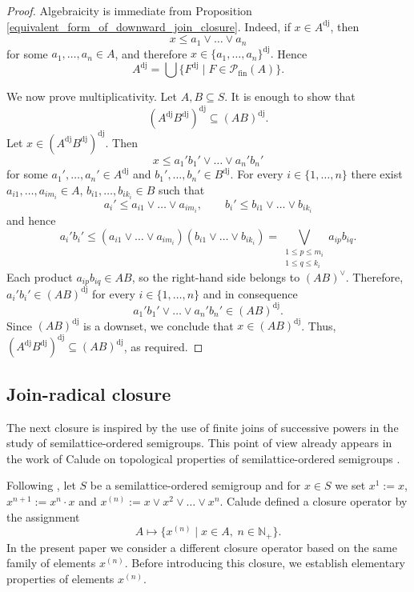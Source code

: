 \documentclass[10pt, reqno]{amsart}
\theoremstyle{plain}
\theoremstyle{definition}
\begin{document}
\begin{proof}
    Algebraicity is immediate from Proposition \ref{equivalent_form_of_downward_join_closure}. Indeed, if $x \in A^\mathrm{dj}$, then $$x \leqslant a_1 \lor \ldots \lor a_n$$ for some $a_1, \ldots, a_n \in A$, and therefore $x \in \{a_1, \ldots, a_n\}^\mathrm{dj}.$ Hence $$A^\mathrm{dj} = \bigcup\{F^\mathrm{dj} \mid F \in \mathcal{P}_\mathrm{fin}(A)\}.$$
    
    We now prove multiplicativity. Let $A, B \subseteq S$. It is enough to show that $$(A^\mathrm{dj}B^\mathrm{dj})^\mathrm{dj} \subseteq (AB)^\mathrm{dj}.$$ Let $x \in (A^\mathrm{dj}B^\mathrm{dj})^\mathrm{dj}$. Then $$x \leqslant a_1'b_1' \lor \ldots \lor a_n'b_n'$$ for some $a_1', \ldots, a_n' \in A^\mathrm{dj}$ and $b_1', \ldots, b_n' \in B^\mathrm{dj}$. For every $i \in \{1, \ldots, n\}$ there exist $a_{i1}, \ldots, a_{im_i} \in A$, $b_{i1}, \ldots, b_{ik_i} \in B$ such that $$a_i' \leqslant a_{i1} \lor \ldots \lor a_{im_i}, \qquad b_i' \leqslant b_{i1} \lor \ldots \lor b_{ik_i}$$ and hence $$a_i'b_i' \leqslant (a_{i1} \lor \ldots \lor a_{im_i})(b_{i1} \lor \ldots \lor b_{ik_i}) = \bigvee_{\substack{1 \leqslant p \leqslant m_i \\1 \leqslant q \leqslant k_i}}a_{ip}b_{iq}.$$ Each product $a_{ip}b_{iq} \in AB$, so the right-hand side belongs to $(AB)^\lor$. Therefore, $a_i'b_i' \in (AB)^\mathrm{dj}$ for every $i\in\{1, \ldots, n\}$ and in consequence $$a_1'b_1' \lor \ldots \lor a_n'b_n' \in (AB)^\mathrm{dj}.$$ Since $(AB)^\mathrm{dj}$ is a downset, we conclude that $x \in (AB)^\mathrm{dj}$. Thus, $(A^\mathrm{dj}B^\mathrm{dj})^\mathrm{dj} \subseteq (AB)^\mathrm{dj}$, as required.  
\end{proof}

\subsection{Join-radical closure}
The next closure is inspired by the use of finite joins of successive powers in the study of semilattice-ordered semigroups. This point of view already appears in the work of Calude on topological properties of semilattice-ordered semigroups \cite{calude1976_1}. 

Following \cite[Section 1]{calude1976_1}, let $S$ be a semilattice-ordered semigroup and for $x\in S$ we set $x^1 := x$, $x^{n + 1} := x^n \cdot x$ and $x^{(n)} := x \lor x^2 \lor \ldots \lor x^n$. Calude defined a closure operator by the assignment $$A \mapsto \{x^{(n)} \mid x \in A,\hspace{3pt} n\in\mathbb{N}_+\}.$$ In the present paper we consider a different closure operator based on the same family of elements $x^{(n)}$. Before introducing this closure, we establish elementary properties of elements $x^{(n)}$. 
\end{document}

